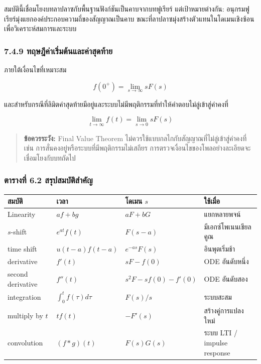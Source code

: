 สมบัตินี้เชื่อมโยงบทลาปลาซกับพื้นฐานฟังก์ชันเป็นคาบจากบทฟูเรียร์ แต่เป้าหมายต่างกัน: อนุกรมฟูเรียร์มุ่งแยกองค์ประกอบความถี่ของสัญญาณเป็นคาบ ขณะที่ลาปลาซมุ่งสร้างตัวแทนในโดเมนเชิงซ้อนเพื่อวิเคราะห์สมการและระบบ

\subsubsection{7.4.9 ทฤษฎีค่าเริ่มต้นและค่าสุดท้าย}

ภายใต้เงื่อนไขที่เหมาะสม

\[
\boxed{f(0^+)=\lim_{s\to\infty}sF(s)}
\]

และสำหรับกรณีที่ลิมิตค่าสุดท้ายมีอยู่และระบบไม่มีพฤติกรรมที่ทำให้คำตอบไม่ลู่เข้าสู่ค่าคงที่

\[
\boxed{\lim_{t\to\infty}f(t)=\lim_{s\to 0}sF(s)}
\]

\begin{quote}
\textbf{ข้อควรระวัง:} Final Value Theorem ไม่ควรใช้แบบกลไกกับสัญญาณที่ไม่ลู่เข้าสู่ค่าคงที่ เช่น การสั่นคงอยู่หรือระบบที่มีพฤติกรรมไม่เสถียร การตรวจเงื่อนไขของโพลอย่างละเอียดจะเชื่อมโยงกับบทถัดไป
\end{quote}

\subsubsection{ตารางที่ 6.2 สรุปสมบัติสำคัญ}

\begin{table}[htbp]
    \centering
    \begin{tabular}{l l l l}
        \hline
        \textbf{สมบัติ} & \textbf{เวลา} & \textbf{โดเมน $s$} & \textbf{ใช้เมื่อ} \\
        \hline
        Linearity & $af+bg$ & $aF+bG$ & แยกหลายพจน์ \\
        $s$-shift & $e^{at}f(t)$ & $F(s-a)$ & มีเอกซ์โพเนนเชียลคูณ \\
        time shift & $u(t-a)f(t-a)$ & $e^{-as}F(s)$ & อินพุตเริ่มช้า \\
        derivative & $f'(t)$ & $sF-f(0)$ & ODE อันดับหนึ่ง \\
        second derivative & $f''(t)$ & $s^2F-sf(0)-f'(0)$ & ODE อันดับสอง \\
        integration & $\int_0^t f(\tau)d\tau$ & $F(s)/s$ & ระบบสะสม \\
        multiply by $t$ & $tf(t)$ & $-F'(s)$ & สร้างคู่การแปลงใหม่ \\
        convolution & $(f*g)(t)$ & $F(s)G(s)$ & ระบบ LTI / impulse response \\
        \hline
    \end{tabular}
\end{table}



